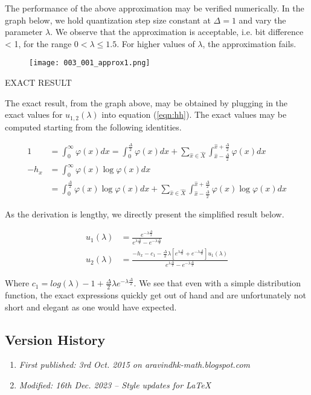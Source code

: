 The performance of the above approximation may be verified numerically. In the graph below, we hold quantization step size constant at $\Delta = 1$ and vary the parameter $\lambda$. We observe that the approximation is acceptable, i.e. bit difference < 1, for the range $0 < \lambda \leq 1.5$. For higher values of $\lambda$, the approximation fails.

\begin{figure}[H]
	\centering
	\texttt{[image: 003\_001\_approx1.png]}
\end{figure}

EXACT RESULT

The exact result, from the graph above, may be obtained by plugging in the exact values for $u_{1,2}(\lambda)$ into equation (\ref{eqn:hh}). The exact values may be computed starting from the following identities.

\begin{align} 1 &= \int_{0}^{\infty} \varphi(x) dx = \int_{0}^{\frac{\Delta}{2}} \varphi(x) dx + \sum_{\hat{x} \in \hat{X}} \int_{\hat{x} - \frac{\Delta}{2}}^{\hat{x} + \frac{\Delta}{2}} \varphi(x) dx \\ -h_x &= \int_{0}^{\infty} \varphi(x) \log \varphi(x) dx \nonumber \\ &= \int_{0}^{\frac{\Delta}{2}} \varphi(x) \log \varphi(x) dx + \sum_{\hat{x} \in \hat{X}} \int_{\hat{x} - \frac{\Delta}{2}}^{\hat{x} + \frac{\Delta}{2}} \varphi(x) \log \varphi(x) dx\end{align}

As the derivation is lengthy, we directly present the simplified result below.

\begin{align} u_1(\lambda) &= \frac{e^{-\lambda\frac{\Delta}{2}}}{e^{\lambda\frac{\Delta}{2}} - e^{-\lambda\frac{\Delta}{2}}} \\ u_2(\lambda) &= \frac{-h_x - c_1  - \frac{\Delta}{2}\lambda  \left[e^{\lambda\frac{\Delta}{2}} + e^{-\lambda\frac{\Delta}{2}}\right] u_1(\lambda)}{e^{\lambda\frac{\Delta}{2}} - e^{-\lambda\frac{\Delta}{2}}}\end{align}

Where $c_1 = log(\lambda) - 1 + \frac{\Delta}{2}\lambda e^{-\lambda\frac{\Delta}{2}}$. We see that even with a simple distribution function, the exact expressions quickly get out of hand and are unfortunately not short and elegant as one would have expected.

\subsection{Version History}
\begin{enumerate}
	\item \emph{First published: 3rd Oct. 2015 on aravindhk-math.blogspot.com}
	\item \emph{Modified: 16th Dec. 2023 -- Style updates for \LaTeX}
\end{enumerate}
